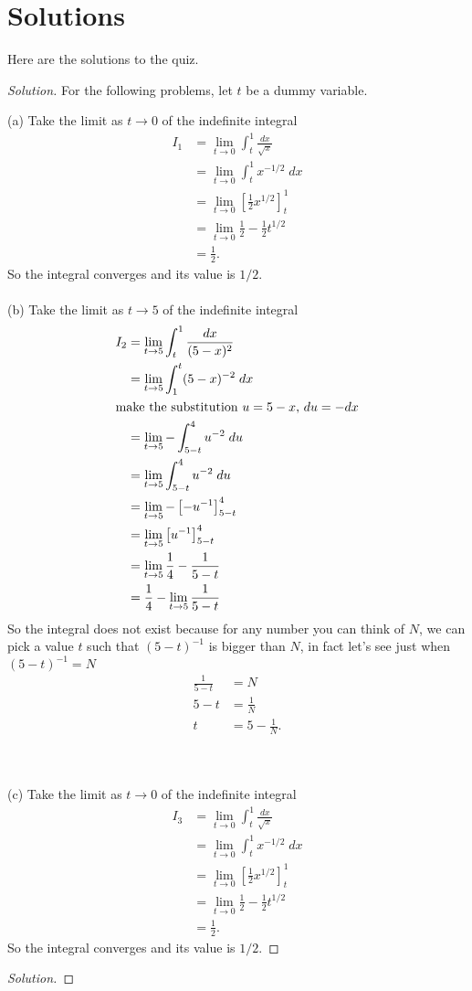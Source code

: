 \section*{Solutions}
Here are the solutions to the quiz.
\begin{proof}[Solution]
For the following problems, let $t$ be a dummy variable.

(a) Take the limit as $t\to 0$ of the indefinite integral
\begin{align*}
I_1&=\lim_{t\to 0}\int_t^1\frac{dx}{\sqrt{x}}\\
   &=\lim_{t\to 0}\int_t^1x^{-1/2}\;dx\\
   &=\lim_{t\to 0}\left[\frac{1}{2}x^{1/2}\right]_t^1\\
   &=\lim_{t\to 0}\frac{1}{2}-\frac{1}{2}t^{1/2}\\
   &=\frac{1}{2}.
\end{align*}
So the integral converges and its value is $1/2$.
\\\\
(b) Take the limit as $t\to 5$ of the indefinite integral
\begin{align*}
I_2&=\lim_{t\to 5}\int_t^1\frac{dx}{(5-x)^2}\\
   &=\lim_{t\to 5}\int_1^t(5-x)^{-2}\;dx\\
\shortintertext{make the substitution $u=5-x$, $du=-dx$}
   &=\lim_{t\to 5}-\int_{5-t}^4u^{-2}\;du\\
   &=\lim_{t\to 5}\int_{5-t}^4 u^{-2}\;du\\
   &=\lim_{t\to 5}-\left[-u^{-1}\right]_{5-t}^4\\
   &=\lim_{t\to 5}\left[u^{-1}\right]_{5-t}^4\\
   &=\lim_{t\to 5}\frac{1}{4}-\frac{1}{5-t}\\
   &=\frac{1}{4}-\lim_{t\to 5}\frac{1}{5-t}\\
\end{align*}
So the integral does not exist because for any number you can think of $N$,
we can pick a value $t$ such that $(5-t)^{-1}$ is bigger than $N$, in
fact let's see just when $(5-t)^{-1}=N$
\begin{align*}
\frac{1}{5-t}&=N\\
5-t&=\frac{1}{N}\\
t&=5-\frac{1}{N}.
\end{align*}

\\\\
(c) Take the limit as $t\to 0$ of the indefinite integral
\begin{align*}
I_3&=\lim_{t\to 0}\int_t^1\frac{dx}{\sqrt{x}}\\
   &=\lim_{t\to 0}\int_t^1x^{-1/2}\;dx\\
   &=\lim_{t\to 0}\left[\frac{1}{2}x^{1/2}\right]_t^1\\
   &=\lim_{t\to 0}\frac{1}{2}-\frac{1}{2}t^{1/2}\\
   &=\frac{1}{2}.
\end{align*}
So the integral converges and its value is $1/2$.
\end{proof}
\begin{proof}[Solution]

\end{proof}

